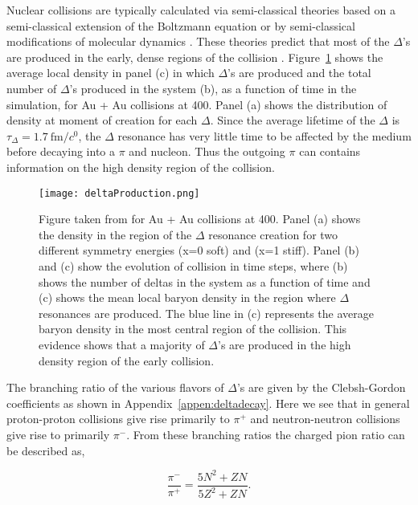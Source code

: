 Nuclear collisions are typically calculated via semi-classical theories based on a semi-classical extension of the Boltzmann equation or by semi-classical modifications of molecular dynamics \cite{bertsch}. These theories predict that most of the $\Delta$'s are produced in the early, dense regions of the collision \cite{mingzhang}. Figure~\ref{fig:deltaProduction} shows the average local density in panel (c)  in which $\Delta$'s are produced and the total  number of $\Delta$'s produced in the system (b), as a function of time in the simulation, for Au + Au collisions at \SI{400}{\MeVA}. Panel (a) shows the distribution of density at moment of creation for each $\Delta$. Since the average lifetime of the $\Delta$  is $\tau_{\Delta} = \SI{1.7}{\femto\metre\per\clight}$, the $\Delta$ resonance has very little time to be affected by the medium before decaying into a $\pi$ and nucleon. Thus the outgoing $\pi$ can contains information on the high density region of the collision. 

\begin{figure}[!htb]
\centering
\texttt{[image: deltaProduction.png]}
\caption{Figure taken from \cite{mingzhang} for Au + Au collisions at \SI{400}{\MeVA}. Panel (a) shows the density in the region of the $\Delta$ resonance creation for two different symmetry energies (x=0 soft) and (x=1 stiff). Panel (b) and (c) show the evolution of collision in time steps, where (b) shows the number of deltas in the system as a function of time and (c) shows the mean local baryon density in the region where $\Delta$ resonances are produced. The blue line in (c) represents the average baryon density in the most central region of the collision. This evidence shows that a majority of $\Delta$'s are produced in the high density region of the early collision.}
\label{fig:deltaProduction}
\end{figure}

The branching ratio of the various flavors of $\Delta$'s are given by the Clebsh-Gordon coefficients as shown in Appendix~\ref{appen:deltadecay}. Here we see that in general proton-proton collisions give rise primarily to  $\pi^+$ and neutron-neutron collisions give rise to primarily $\pi^-$. From these branching ratios the charged pion ratio can be described as,

\begin{equation}
\frac{\pi^-}{\pi^+} = \frac{ 5N^2 + ZN }{5Z^2 + ZN}.
\label{eq:deltaModel}
\end{equation}

